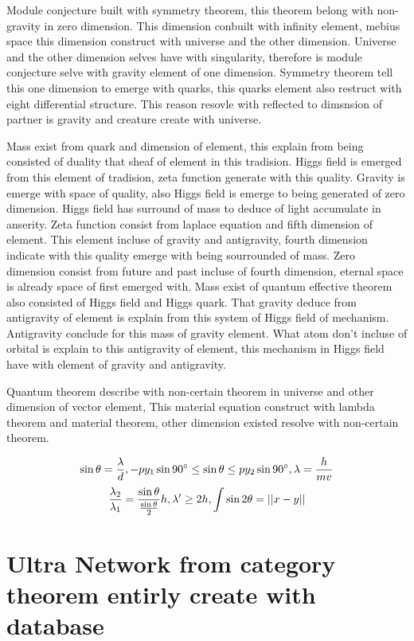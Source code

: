 \documentclass{jsarticle}
\begin{document}
  Module conjecture built with symmetry theorem, this theorem belong with non-gravity in zero dimension.
This dimension conbuilt with infinity element, mebius space this dimension construct with universe and the other dimension.
Universe and the other dimension selves have with singularity, therefore is module conjecture selve with gravity element of one dimension.
Symmetry theorem tell this one dimension to emerge with quarks, this quarks element also restruct with eight differential structure. 
This reason resovle with reflected to dimsnsion of partner is gravity and creature create with universe.

  Mass exist from quark and dimension of element, this explain from being consisted of duality that sheaf of element in this tradision.
Higgs field is emerged from this element of tradision, zeta function generate with this quality.
Gravity is emerge with space of quality, also Higgs field is emerge to being generated of zero dimension.
Higgs field has surround of mass to deduce of light accumulate in anserity.
Zeta function consist from laplace equation and fifth dimension of element.
This element incluse of gravity and antigravity, fourth dimension indicate with this quality emerge with being sourrounded of mass.
Zero dimension consist from future and past incluse of fourth dimension, eternal space is already space of first emerged with. 
Mass exist of quantum effective theorem also consisted of Higgs field and Higgs quark.
That gravity deduce from antigravity of element is explain from this system of Higgs field of mechanism.
Antigravity conclude for this mass of gravity element.
What atom don't incluse of orbital is explain to this antigravity of element, this mechanism in Higgs field have with element
of gravity and antigravity. 

 Quantum theorem describe with non-certain theorem in universe and other dimension of vector element,
This material equation construct with lambda theorem and material theorem, other dimension existed resolve with 
non-certain theorem.

$$ \sin \theta = {\lambda \over d}, - py_1 \sin 90^{\circ} \le \sin \theta \le py_2 \sin 90^{\circ}, \lambda = {h \over mv} $$
 $$ {\lambda_2 \over \lambda_1} = {\sin \theta \over {\sin \theta \over 2}} h,  
  \lambda' \ge 2h , \int  \sin 2\theta = ||x - y|| $$

\section{Ultra Network from category theorem entirly create with database}
\end{document}
